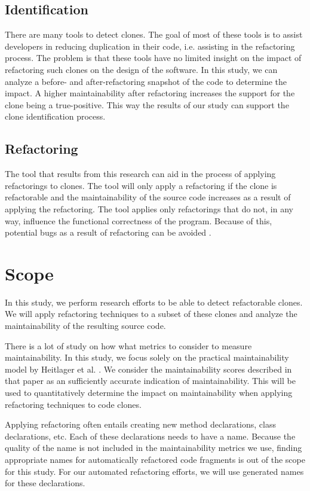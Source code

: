 \subsection{Identification}
There are many tools to detect clones. The goal of most of these tools is to assist developers in reducing duplication in their code, i.e. assisting in the refactoring process. The problem is that these tools have no limited %
insight on the impact of refactoring such clones on the design of the software. In this study, we can analyze a before- and after-refactoring snapshot of the code to determine the impact. A higher maintainability after refactoring increases the support for the clone being a true-positive. This way the results of our study can support the clone identification process.

\subsection{Refactoring}
The tool that results from this research can aid in the process of applying refactorings to clones. The tool will only apply a refactoring if the clone is refactorable and the maintainability of the source code increases as a result of applying the refactoring. The tool applies only refactorings that do not, in any way, influence the functional correctness of the program. Because of this, potential bugs as a result of refactoring can be avoided \cite{bavota2012does}.

\section{Scope}
In this study, we perform research efforts to be able to detect refactorable clones. We will apply refactoring techniques to a subset of these clones and analyze the maintainability of the resulting source code.

There is a lot of study on how what metrics to consider to measure maintainability. In this study, we focus solely on the practical maintainability model by Heitlager et al. \cite{heitlager2007practical}. We consider the maintainability scores described in that paper as an sufficiently accurate indication of maintainability. This will be used to quantitatively determine the impact on maintainability when applying refactoring techniques to code clones.

Applying refactoring often entails creating new method declarations, class declarations, etc. Each of these declarations needs to have a name. Because the quality of the name is not included in the maintainability metrics we use, finding appropriate names for automatically refactored code fragments is out of the scope for this study. For our automated refactoring efforts, we will use generated names for these declarations.

